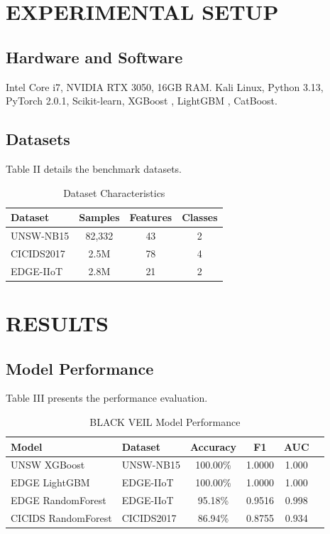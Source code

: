 \documentclass[10pt,journal,compsoc]{IEEEtran}
\begin{document}
\section{EXPERIMENTAL SETUP}
\subsection{Hardware and Software}
Intel Core i7, NVIDIA RTX 3050, 16GB RAM. Kali Linux, Python 3.13, PyTorch 2.0.1, Scikit-learn, XGBoost \cite{xgboost2016}, LightGBM \cite{lightgbm2017}, CatBoost.

\subsection{Datasets}
Table II details the benchmark datasets.

\begin{table}[H]
\centering
\caption{Dataset Characteristics}
\begin{tabular}{|l|c|c|c|}
\hline
\textbf{Dataset} & \textbf{Samples} & \textbf{Features} & \textbf{Classes} \\
\hline
UNSW-NB15 \cite{unsw2017} & 82,332 & 43 & 2 \\
CICIDS2017 \cite{cicids2019} & 2.5M & 78 & 4 \\
EDGE-IIoT \cite{edge2022} & 2.8M & 21 & 2 \\
\hline
\end{tabular}
\label{tab:datasets}
\end{table}

\section{RESULTS}
\subsection{Model Performance}
Table III presents the performance evaluation.

\begin{table}[H]
\centering
\caption{BLACK VEIL Model Performance}
\small
\begin{tabular}{|l|l|c|c|c|c|}
\hline
\textbf{Model} & \textbf{Dataset} & \textbf{Accuracy} & \textbf{F1} & \textbf{AUC} \\
\hline
UNSW XGBoost \cite{xgboost2016} & UNSW-NB15 & 100.00\% & 1.0000 & 1.000 \\
EDGE LightGBM \cite{lightgbm2017} & EDGE-IIoT & 100.00\% & 1.0000 & 1.000 \\
EDGE RandomForest & EDGE-IIoT & 95.18\% & 0.9516 & 0.998 \\
CICIDS RandomForest & CICIDS2017 & 86.94\% & 0.8755 & 0.934 \\
\hline
\end{tabular}
\label{tab:performance}
\end{table}
\end{document}
